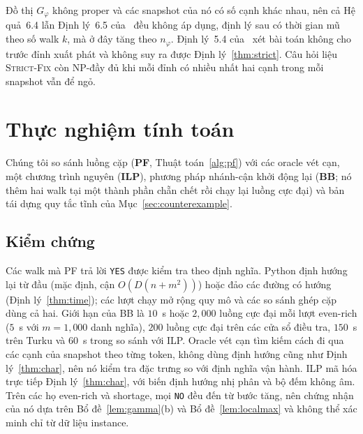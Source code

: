 \documentclass[pdflatex,sn-mathphys-num]{sn-jnl}
\theoremstyle{thmstyleone}
\theoremstyle{thmstyletwo}
\theoremstyle{thmstylethree}
\newcommand{\SFIX}{\textup{\textsc{Strict-Fix}}}
\newcommand{\YES}{\texttt{YES}}
\newcommand{\NO}{\texttt{NO}}
\begin{document}
Đồ thị $G_\varphi$ không proper và các snapshot của nó có số cạnh khác nhau, nên cả Hệ quả~6.4 lẫn Định lý~6.5 của~\cite{deligkas2025} đều không áp dụng, định lý sau có thời gian mũ theo số walk $k$, mà ở đây tăng theo $n_\varphi$. Định lý~5.4 của~\cite{deligkas2025} xét bài toán không cho trước đỉnh xuất phát và không suy ra được Định lý~\ref{thm:strict}. Câu hỏi liệu \SFIX{} còn NP-đầy đủ khi mỗi đỉnh có nhiều nhất hai cạnh trong mỗi snapshot vẫn để ngỏ.

\section{Thực nghiệm tính toán}\label{sec:eval}

Chúng tôi so sánh luồng cặp (\textbf{PF}, Thuật toán~\ref{alg:pf}) với các oracle vét cạn, một chương trình nguyên (\textbf{ILP}), phương pháp nhánh-cận khởi động lại (\textbf{BB}; nó thêm hai walk tại một thành phần chẵn chết rồi chạy lại luồng cực đại) và bản tái dựng quy tắc tĩnh của Mục~\ref{sec:counterexample}.

\subsection{Kiểm chứng}\label{sec:exp-correct}

Các walk mà PF trả lời \YES{} được kiểm tra theo định nghĩa. Python định hướng lại từ đầu (mặc định, cận $O(D(n+m^2))$) hoặc đảo các đường có hướng (Định lý~\ref{thm:time}); các lượt chạy mở rộng quy mô và các so sánh ghép cặp dùng cả hai. Giới hạn của BB là $10$~s hoặc $2{,}000$ luồng cực đại mỗi lượt even-rich ($5$~s với $m=1{,}000$ danh nghĩa), $200$ luồng cực đại trên các cửa sổ điều tra, $150$~s trên Turku và $60$~s trong so sánh với ILP. Oracle vét cạn tìm kiếm cách đi qua các cạnh của snapshot theo từng token, không dùng định hướng cũng như Định lý~\ref{thm:char}, nên nó kiểm tra đặc trưng so với định nghĩa vận hành. ILP mã hóa trực tiếp Định lý~\ref{thm:char}, với biến định hướng nhị phân và bộ đếm không âm. Trên các họ even-rich và shortage, mọi \NO{} đều đến từ bước tăng, nên chứng nhận của nó dựa trên Bổ đề~\ref{lem:gamma}(b) và Bổ đề~\ref{lem:localmax} và không thể xác minh chỉ từ dữ liệu instance.
\end{document}
